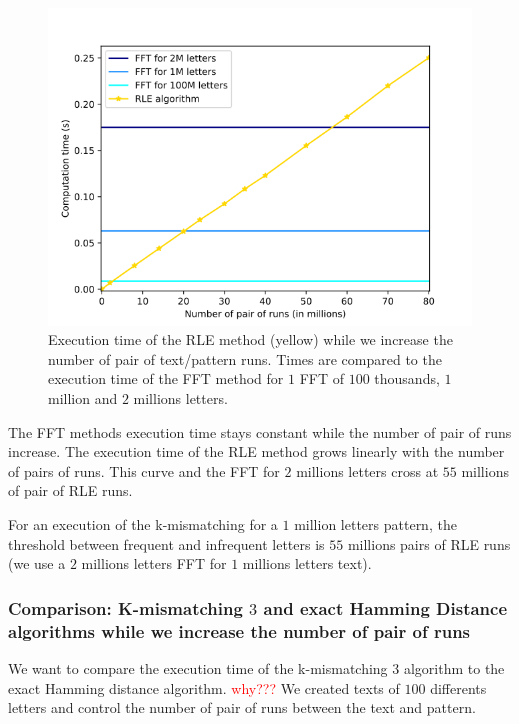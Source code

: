 \documentclass[preprint,12pt]{elsarticle}
\begin{document}
\begin{figure}[h]
\centering
\includegraphics[scale=0.7]{./figures/OptiComparOptiNaivHD.png}
\caption{Execution time of the RLE method (yellow) while we increase the number of pair of text/pattern runs.
Times are compared to the execution time of the FFT method for $1$ FFT of $100$ thousands,
$1$ million and $2$ millions letters.}
\label{OptiComp}
\end{figure}

The FFT methods execution time stays constant while the number of pair of runs increase. 
The execution time of the RLE method grows linearly with the number of pairs of runs.
This curve and the FFT for $2$ millions letters cross at $55$ millions of pair of RLE runs.   

For an execution of the k-mismatching for a $1$ million letters pattern,
the threshold between frequent and infrequent letters is $55$ millions pairs of RLE runs
(we use a $2$ millions letters FFT for $1$ millions letters text).



\subsubsection*{Comparison: K-mismatching $3$ and exact Hamming Distance algorithms while we increase the number of pair of runs}

We want to compare the execution time of the k-mismatching $3$ algorithm to the exact Hamming distance algorithm.
\textcolor{red}{why???}
We created texts of $100$ differents letters and control the number of pair of runs
between the text and pattern.
\end{document}
